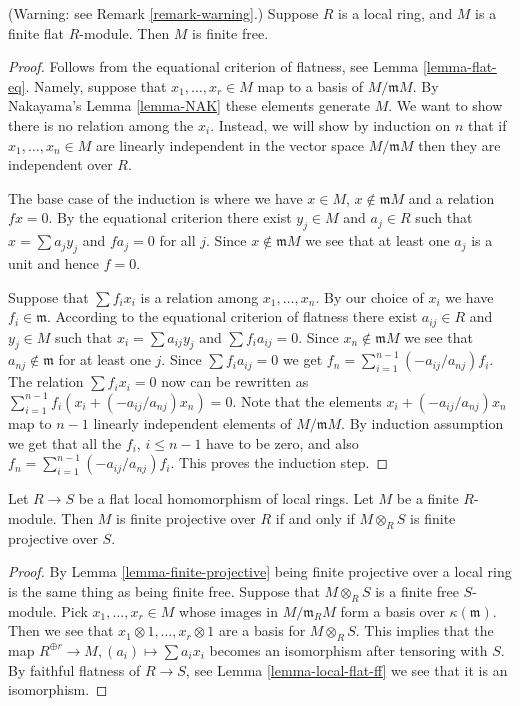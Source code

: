 \begin{lemma}
\label{lemma-finite-flat-local}
(Warning: see Remark \ref{remark-warning}.)
Suppose $R$ is a local ring, and $M$ is a finite
flat $R$-module. Then $M$ is finite free.
\end{lemma}

\begin{proof}
Follows from the equational criterion of flatness, see
Lemma \ref{lemma-flat-eq}. Namely, suppose that
$x_1, \ldots, x_r \in M$ map to a basis of
$M/\mathfrak mM$. By Nakayama's Lemma \ref{lemma-NAK}
these elements generate $M$. We want to show there
is no relation among the $x_i$. Instead, we will show
by induction on $n$ that if $x_1, \ldots, x_n \in M$
are linearly independent in the vector space
$M/\mathfrak mM$ then they are independent over $R$.

\medskip\noindent
The base case of the induction is where we have
$x \in M$, $x \not\in \mathfrak mM$ and a relation
$fx = 0$. By the equational criterion there
exist $y_j \in M$ and $a_j \in R$ such that
$x = \sum a_j y_j$ and $fa_j = 0$ for all $j$.
Since $x \not\in \mathfrak mM$ we see that
at least one $a_j$ is a unit and hence $f = 0 $.

\medskip\noindent
Suppose that $\sum f_i x_i$ is a relation among $x_1, \ldots, x_n$.
By our choice of $x_i$ we have $f_i \in \mathfrak m$.
According to the equational criterion of flatness there exist
$a_{ij} \in R$ and $y_j \in M$ such that
$x_i = \sum a_{ij} y_j$ and $\sum f_i a_{ij} = 0$.
Since $x_n \not \in \mathfrak mM$ we see that
$a_{nj}\not\in \mathfrak m$ for at least one $j$.
Since $\sum f_i a_{ij} = 0$ we get
$f_n = \sum_{i = 1}^{n-1} (-a_{ij}/a_{nj}) f_i$.
The relation $\sum f_i x_i = 0$ now can be rewritten
as $\sum_{i = 1}^{n-1} f_i( x_i + (-a_{ij}/a_{nj}) x_n) = 0$.
Note that the elements $x_i + (-a_{ij}/a_{nj}) x_n$ map
to $n-1$ linearly independent elements of $M/\mathfrak mM$.
By induction assumption we get that all the $f_i$, $i \leq n-1$
have to be zero, and also $f_n = \sum_{i = 1}^{n-1} (-a_{ij}/a_{nj}) f_i$.
This proves the induction step.
\end{proof}

\begin{lemma}
\label{lemma-finite-projective-descends}
Let $R \to S$ be a flat local homomorphism of local rings.
Let $M$ be a finite $R$-module. Then $M$ is finite projective
over $R$ if and only if $M \otimes_R S$ is finite projective
over $S$.
\end{lemma}

\begin{proof}
By Lemma \ref{lemma-finite-projective} being finite projective
over a local ring is the same thing as being finite free.
Suppose that $M \otimes_R S$ is a finite free $S$-module.
Pick $x_1, \ldots, x_r \in M$ whose images in $M/\mathfrak m_RM$
form a basis over $\kappa(\mathfrak m)$. Then
we see that $x_1 \otimes 1, \ldots, x_r \otimes 1$
are a basis for $M \otimes_R S$. This implies that
the map $R^{\oplus r} \to M, (a_i) \mapsto \sum a_i x_i$
becomes an isomorphism after tensoring with $S$.
By faithful flatness of $R \to S$, see Lemma \ref{lemma-local-flat-ff}
we see that it is an isomorphism.
\end{proof}

